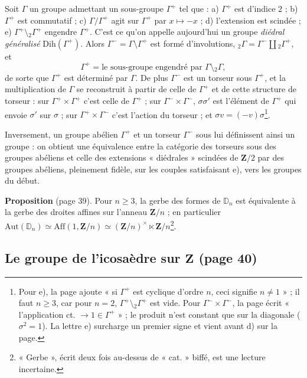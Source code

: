\documentclass[11pt,a4paper]{article}
\begin{document}
Soit $\Gamma$ un groupe admettant un sous-groupe $\Gamma^+$ tel que : a)
$\Gamma^+$ est d'indice $2$ ; b) $\Gamma^+$ est commutatif ; c)
$\Gamma/\Gamma^+$ agit sur $\Gamma^+$ par $x \mapsto -x$ ; d) l'extension est
scindée ; e) $\Gamma^+ \setminus {}_2\Gamma^+$ engendre $\Gamma^+$. C'est ce
qu'on appelle aujourd'hui un groupe \emph{diédral généralisé}
$\mathrm{Dih}(\Gamma^+)$. Alors $\Gamma^- = \Gamma \setminus \Gamma^+$ est
formé d'involutions, ${}_2\Gamma = \Gamma^- \amalg {}_2\Gamma^+$, et
\[
  \Gamma^+ = \text{le sous-groupe engendré par } \Gamma \setminus {}_2\Gamma ,
\]
de sorte que $\Gamma^+$ est déterminé par $\Gamma$. De plus $\Gamma^-$ est un
torseur sous $\Gamma^+$, et la multiplication de $\Gamma$ se reconstruit à
partir de celle de $\Gamma^+$ et de cette structure de torseur : sur
$\Gamma^+ \times \Gamma^+$ c'est celle de $\Gamma^+$ ; sur $\Gamma^- \times
\Gamma^-$, $\sigma\sigma'$ est l'élément de $\Gamma^+$ qui envoie $\sigma'$
sur $\sigma$ ; sur $\Gamma^+ \times \Gamma^-$ c'est l'action du torseur ; et
$\sigma v = (-v)\sigma$\footnote{Pour e), la page ajoute « si $\Gamma^+$ est
cyclique d'ordre $n$, ceci signifie $n \neq 1$ » ; il faut $n \geq 3$, car pour
$n = 2$, $\Gamma^+ \setminus {}_2\Gamma^+$ est vide. Pour $\Gamma^- \times
\Gamma^-$, la page écrit « l'application ct. $\to 1 \in \Gamma^+$ » ; le
produit n'est constant que sur la diagonale ($\sigma^2 = 1$). La lettre e)
surcharge un premier signe et vient avant d) sur la page.}.

Inversement, un groupe abélien $\Gamma^+$ et un torseur $\Gamma^-$ sous lui
définissent ainsi un groupe : on obtient une équivalence entre la catégorie des
torseurs sous des groupes abéliens et celle des extensions « diédrales »
scindées de $\mathbf{Z}/2$ par des groupes abéliens, pleinement fidèle, sur les
couples satisfaisant e), vers les groupes du début.

\textbf{Proposition} (page 39). Pour $n \geq 3$, la gerbe des formes de
$\mathbb{D}_n$ est équivalente à la gerbe des droites affines sur l'anneau
$\mathbf{Z}/n$ ; en particulier $\mathrm{Aut}(\mathbb{D}_n) \simeq
\mathrm{Aff}(1, \mathbf{Z}/n) \simeq (\mathbf{Z}/n)^\times \ltimes
\mathbf{Z}/n$\footnote{« Gerbe », écrit deux fois au-dessus de « cat. » biffé,
est une lecture incertaine.}.

\subsection*{Le groupe de l'icosaèdre sur $\mathbf{Z}$ (page 40)}
\end{document}
